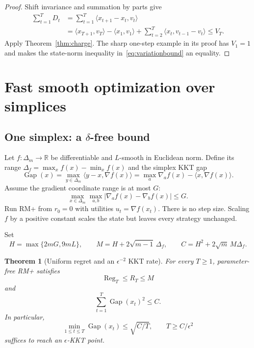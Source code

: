 \documentclass{article}
\newtheorem{theorem}{Theorem}
\newcommand{\Reg}{\operatorname{Reg}}
\newcommand{\Gap}{\operatorname{Gap}}
\begin{document}
\begin{proof}
Shift invariance and summation by parts give
\begin{align}
\sum_{t=1}^TD_t
&=\sum_{t=1}^T\langle x_{t+1}-x_t,v_t\rangle\nonumber\\
&=\langle x_{T+1},v_T\rangle-\langle x_1,v_1\rangle
+\sum_{t=2}^T\langle x_t,v_{t-1}-v_t\rangle\le V_T.
\label{eq:abel}
\end{align}
Apply Theorem~\ref{thm:charge}. The sharp one-step example in its proof has $V_1=1$ and makes the state-norm inequality in~\eqref{eq:variationbound} an equality.
\end{proof}

\section{Fast smooth optimization over simplices}
\label{sec:optimization}

\subsection{One simplex: a $\delta$-free bound}

Let $f:\Delta_m\to\mathbb R$ be differentiable and $L$-smooth in Euclidean norm. Define its range $\Delta_f=\max_xf(x)-\min_xf(x)$ and the simplex KKT gap
\begin{equation}
\Gap(x)=\max_{y\in\Delta_m}\langle y-x,\nabla f(x)\rangle
=\max_a\nabla_af(x)-\langle x,\nabla f(x)\rangle.
\label{eq:kktgap}
\end{equation}
Assume the gradient coordinate range is at most $G$:
\begin{equation}
\max_{x\in\Delta_m}\max_{a,b}|\nabla_af(x)-\nabla_bf(x)|\le G.
\label{eq:gradientrange}
\end{equation}
Run RM+ from $r_0=0$ with utilities $u_t=\nabla f(x_t)$. There is no step size. Scaling $f$ by a positive constant scales the state but leaves every strategy unchanged.

Set
\begin{equation}
H=\max\{2mG,9mL\},
\qquad
M=H+2\sqrt{m-1}\,\Delta_f,
\qquad
C=H^2+2\sqrt m\,M\Delta_f.
\label{eq:constants}
\end{equation}

\begin{theorem}[Uniform regret and an $\epsilon^{-2}$ KKT rate]
\label{thm:smooth}
For every $T\ge1$, parameter-free RM+ satisfies
\begin{equation}
\Reg_T\le R_T\le M
\label{eq:smoothstate}
\end{equation}
and
\begin{equation}
\sum_{t=1}^T\Gap(x_t)^2\le C.
\label{eq:gapsum}
\end{equation}
In particular,
\begin{equation}
\min_{1\le t\le T}\Gap(x_t)\le\sqrt{C/T},
\qquad
T\ge C/\epsilon^2
\label{eq:kktrate}
\end{equation}
suffices to reach an $\epsilon$-KKT point.
\end{theorem}
\end{document}
